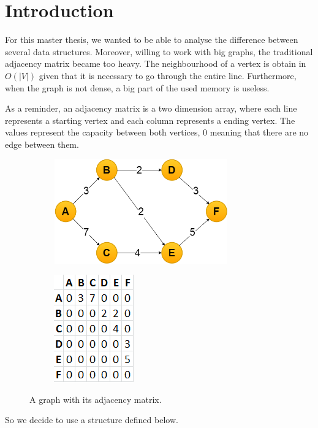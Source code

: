 \section{Introduction}
For this master thesis, we wanted to be able to analyse the difference between several data structures. Moreover, willing to work with big graphs, the traditional adjacency matrix became too heavy. The neighbourhood of a vertex is obtain in $O(|V|)$ given that it is necessary to go through the entire line. Furthermore, when the graph is not dense, a big part of the used memory is useless.

As a reminder, an adjacency matrix is a two dimension array, where each line represents a starting vertex and each column represents a ending vertex. The values represent the capacity between both vertices, 0 meaning that there are no edge between them. \newline

\begin{figure}[!h]
\begin{subfigure}{.6\textwidth}
\includegraphics[width=7.5cm,height=4.5cm]{images/graph.png}
\end{subfigure}
\begin{subfigure}{.4\textwidth}
\includegraphics[scale=0.7]{images/adjacencyMatrix.png}
\end{subfigure}
\caption{A graph with its adjacency matrix.}
\end{figure}

So we decide to use a structure defined below. \newline

